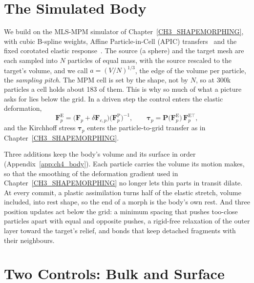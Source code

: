 \section{The Simulated Body}
\label{ch4:sec_body}

We build on the MLS-MPM simulator of Chapter~\ref{CH3_SHAPEMORPHING}, with cubic B-spline weights, Affine Particle-in-Cell (APIC)
transfers~\citep{2015-APIC,jiang2016material} and the fixed corotated elastic response~\citep{stomakhin2012energetically}. The source (a sphere) and the target mesh
are each sampled into $N$ particles of equal mass, with the source rescaled to the target's volume, and we call
$a=(V/N)^{1/3}$, the edge of the volume per particle, the \emph{sampling pitch}. The MPM cell is set by the shape, not by
$N$, so at 300k particles a cell holds about 183 of them. This is why so much of what a picture asks for lies below the
grid. In a driven step the control enters the elastic deformation,
\begin{equation}
\label{eq:control_F}
\mathbf{F}^{\mathrm{E}}_p=\big(\mathbf{F}_p+\delta\mathbf{F}_{c,p}\big)\big(\mathbf{F}^{\mathrm{P}}_p\big)^{-1},
\qquad
\boldsymbol{\tau}_p=\mathbf{P}\big(\mathbf{F}^{\mathrm{E}}_p\big)\,\mathbf{F}^{\mathrm{E}\top}_p ,
\end{equation}
and the Kirchhoff stress $\boldsymbol{\tau}_p$ enters the particle-to-grid transfer as in Chapter~\ref{CH3_SHAPEMORPHING}.

Three additions keep the body's volume and its surface in order (Appendix~\ref{app:ch4_body}). Each particle carries the
volume its motion makes, so that the smoothing of the deformation gradient used in Chapter~\ref{CH3_SHAPEMORPHING} no
longer lets thin parts in transit dilate. At every commit, a plastic assimilation turns half of the elastic stretch,
volume included, into rest shape, so the end of a morph is the body's own rest. And three position updates act below the
grid: a minimum spacing that pushes too-close particles apart with equal and opposite pushes, a rigid-free relaxation of
the outer layer toward the target's relief, and bonds that keep detached fragments with their neighbours.

\section{Two Controls: Bulk and Surface}
\label{ch4:sec_controls}


